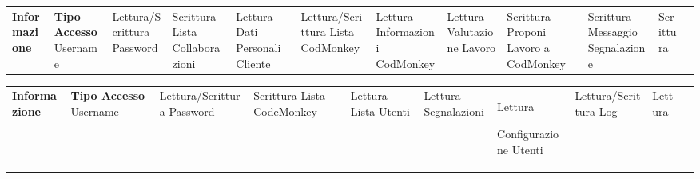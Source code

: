 \begin{center}
\begin{tabularx}
         \n
     \end{tabularx}
     \label{tab:monkeytable:problema:tabellafmeiageahjnaijgnaij}

     \begin{tabularx}
        {\textwidth} {|X|X|}
         \hline  {}
         \n      {}
         \large \textbf{Informazione} & \centering\large\textbf{Tipo Accesso}
         \n                   Username        & Lettura/Scrittura
         \n            Password               & Scrittura
         \n     Lista Collaborazioni     &   Lettura
         \n     Dati Personali Cliente    &   Lettura/Scrittura
         \n     Lista CodMonkey  & Lettura
         \n     Informazioni CodMonkey  & Lettura
         \n    Valutazione Lavoro & Scrittura
         \n Proponi Lavoro a CodMonkey & Scrittura
         \n   Messaggio Segnalazione & Scrittura
         \n
     \end{tabularx}
     \label{tab:monkeytable:problema:tabellafmeiageahjnaijgnaij}

     \begin{tabularx}
        {\textwidth} {|X|X|}
         \hline  {}
         \n      {}
         \large \textbf{Informazione} & \centering\large\textbf{Tipo Accesso}
         \n            Username               &  Lettura/Scrittura
         \n            Password               &   Scrittura
         \n Lista CodeMonkey & Lettura
         \n Lista Utenti & Lettura
         \n    Segnalazioni   & Lettura
         
         \n           Configurazione Utenti    &  Lettura/Scrittura
         \n     Log & Lettura
         \n
     \end{tabularx}
     \label{tab:monkeytable:problema:tabellafmeiageahjnaijgnaij}




\end{center}

